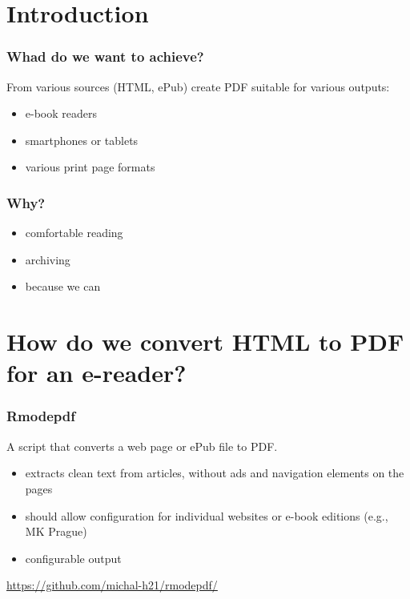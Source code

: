 \section{Introduction}

\begin{frame}
  \frametitle{Whad do we want to achieve?}
    From various sources (HTML, ePub) create PDF suitable for various outputs:
    \begin{itemize}
      \item e-book readers
      \item smartphones or tablets
      \item various print page formats
    \end{itemize}

  \end{frame}
  \begin{frame}
    \frametitle{Why?}

    \begin{itemize}
      \item comfortable reading
      \item archiving
      \item because we can
    \end{itemize}


\end{frame}

\section{How do we convert HTML to PDF for an e-reader?}

\begin{frame}
  \frametitle{Rmodepdf}

  A script that converts a web page or ePub file to PDF.

  \begin{itemize}
    \item extracts clean text from articles, without ads and navigation elements on the pages
    \item should allow configuration for individual websites or e-book editions (e.g., MK Prague)
    \item configurable output
  \end{itemize}


  \url{https://github.com/michal-h21/rmodepdf/}
\end{frame}

